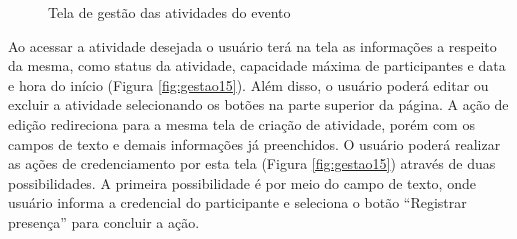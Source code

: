 \begin{figure}[H]
    \centering
    \caption{Tela de gestão das atividades do evento}
    \label{fig:gestao14}
\end{figure}

Ao acessar a atividade desejada o usuário terá na tela as informações a respeito da mesma, como status da atividade, capacidade máxima de participantes e data e hora do início (Figura \ref{fig:gestao15}). Além disso, o usuário poderá editar ou excluir a atividade selecionando os botões na parte superior da página. A ação de edição redireciona para a mesma tela de criação de atividade, porém com os campos de texto e demais informações já preenchidos. O usuário poderá realizar as ações de credenciamento por esta tela (Figura \ref{fig:gestao15}) através de duas possibilidades. A primeira possibilidade é por meio do campo de texto, onde usuário informa a credencial do participante e seleciona o botão “Registrar presença” para concluir a ação.

